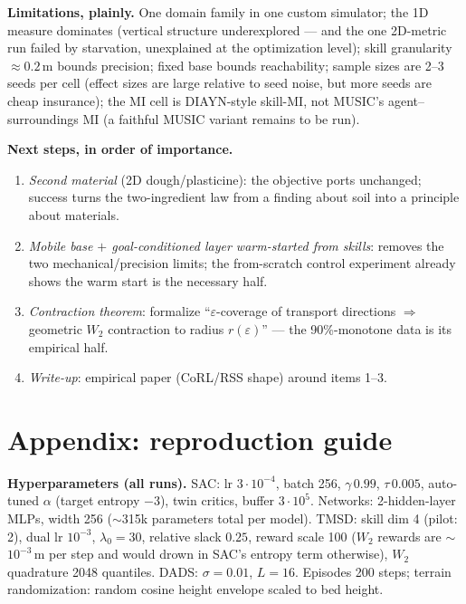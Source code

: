 \documentclass[11pt,a4paper]{article}
\begin{document}
\textbf{Limitations, plainly.} One domain family in one custom simulator; the
1D measure dominates (vertical structure underexplored --- and the one 2D-metric
run failed by starvation, unexplained at the optimization level); skill
granularity $\approx 0.2$\,m bounds precision; fixed base bounds reachability;
sample sizes are 2--3 seeds per cell (effect sizes are large relative to
seed noise, but more seeds are cheap insurance); the MI cell is DIAYN-style
skill-MI, not MUSIC's agent--surroundings MI (a faithful MUSIC variant remains
to be run).

\medskip
\textbf{Next steps, in order of importance.}
\begin{enumerate}[leftmargin=6mm]
\item \emph{Second material} (2D dough/plasticine): the objective ports
unchanged; success turns the two-ingredient law from a finding about soil into
a principle about materials.
\item \emph{Mobile base $+$ goal-conditioned layer warm-started from skills}:
removes the two mechanical/precision limits; the from-scratch control
experiment already shows the warm start is the necessary half.
\item \emph{Contraction theorem}: formalize ``$\varepsilon$-coverage of
transport directions $\Rightarrow$ geometric $W_2$ contraction to radius
$r(\varepsilon)$'' --- the 90\%-monotone data is its empirical half.
\item \emph{Write-up}: empirical paper (CoRL/RSS shape) around items 1--3.
\end{enumerate}

\appendix
\section{Appendix: reproduction guide}

\textbf{Hyperparameters (all runs).} SAC: lr $3{\cdot}10^{-4}$, batch 256,
$\gamma\,0.99$, $\tau\,0.005$, auto-tuned $\alpha$ (target entropy $-3$), twin
critics, buffer $3{\cdot}10^5$. Networks: 2-hidden-layer MLPs, width 256
($\sim$315k parameters total per model). TMSD: skill dim 4 (pilot: 2), dual lr
$10^{-3}$, $\lambda_0 = 30$, relative slack $0.25$, reward scale 100 ($W_2$
rewards are $\sim$$10^{-3}$\,m per step and would drown in SAC's entropy term
otherwise), $W_2$ quadrature 2048 quantiles. DADS: $\sigma = 0.01$, $L = 16$.
Episodes 200 steps; terrain randomization: random cosine height envelope scaled
to bed height.
\end{document}
